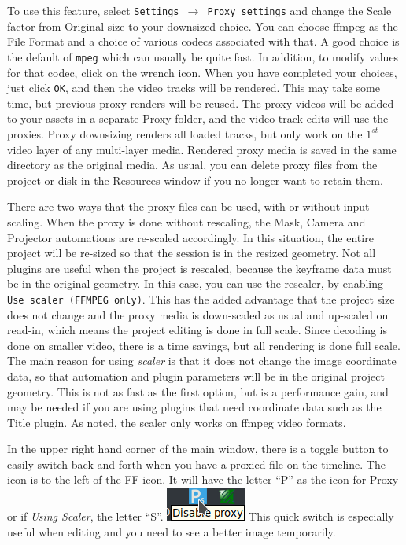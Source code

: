 To use this feature, select \texttt{Settings $\rightarrow$ Proxy settings} and change the Scale factor from Original size to your downsized choice.  You can choose ffmpeg as the File Format and a choice of various codecs associated with that.  A good choice is the default of \texttt{mpeg} which can usually be quite fast.  In addition, to modify values for that codec, click on the wrench icon.  When you have completed your choices, just click \texttt{OK}, and then the video tracks will be rendered. This may take some time, but previous proxy renders will be reused.  The proxy videos will be added to your assets in a separate Proxy folder, and the video track edits will use the proxies.   Proxy downsizing renders all loaded tracks, but only work on the $1^{st}$ video layer of any multi-layer media.  Rendered proxy media is saved in the same directory as the original media.  As usual, you can delete proxy files from the project or disk in the Resources window if you no longer want to retain them.

There are two ways that the proxy files can be used, with or without input scaling. When the proxy is done without rescaling, the Mask, Camera and Projector automations are re-scaled accordingly. In this situation, the entire project will be re-sized so that the session is in the resized geometry.  Not all plugins are useful when the project is rescaled, because the keyframe data must be in the original geometry.  In this case, you can use the rescaler, by enabling \texttt{Use scaler (FFMPEG only)}. This has the added advantage that the project size does not change and the proxy media is down-scaled as usual and up-scaled on read-in, which means the project editing is done in full scale.   Since decoding is done on smaller video, there is a time savings, but all rendering is done full scale.  The main reason for using \textit{scaler} is that it does not change the image coordinate data, so that automation and plugin parameters will be in the original project geometry.   This is not as fast as the first option, but is a performance gain, and may be needed if you are using plugins that need coordinate data such as the Title plugin.  As noted, the scaler only works on ffmpeg video formats.

In the upper right hand corner of the main window, there is a toggle button to easily switch back and forth when you have a proxied file on the timeline.  The icon is to the left of the FF icon.  It will have the letter “P” as the icon for Proxy or if \textit{Using Scaler}, the letter “S”. \quad \includegraphics[height=\baselineskip]{images/proxy-01.png} \quad This quick switch is especially useful when editing and you need to see a better image temporarily.

